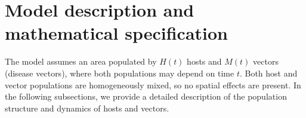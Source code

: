 \documentclass[a4paper]{article}
\begin{document}
%

\section{Model description and mathematical specification}\label{sec.Bdnmdel}

\noindent The model assumes an area populated by $H(t)$ hosts and $M(t)$  vectors (disease vectors), where both populations may depend on time $t$.  Both host and vector populations are homogeneously mixed, so no spatial effects are present.  In the following subsections, we provide a detailed description of the population structure and dynamics of hosts and vectors.
\end{document}
